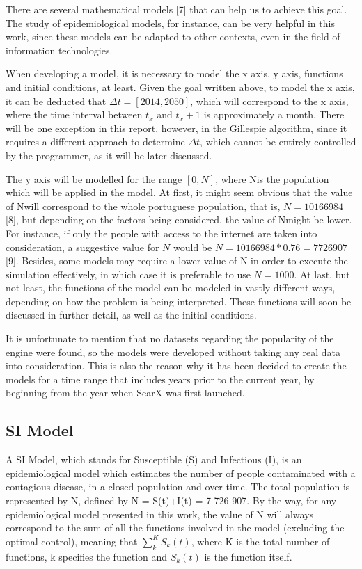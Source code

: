 \documentclass{article}
\begin{document}
There are several mathematical models [7] that can help us to achieve this goal. The study of epidemiological models, for instance, can be very helpful in this work, since these models can be adapted to other contexts, even in the field of information technologies. 

When developing a model, it is necessary to model the x axis, y axis, functions and initial conditions, at least. Given the goal written above, to model the x axis, it can be deducted that $\Delta t = [2014, 2050]$, which will correspond to the x axis, where the time interval between $t_x$ and $t_x+1$ is approximately a month. There will be one exception in this report, however, in the Gillespie algorithm, since it requires a different approach to determine $\Delta t$, which cannot be entirely controlled by the programmer, as it will be later discussed.

The y axis will be modelled for the range $[0, N]$, where Nis the population which will be applied in the model. At first, it might seem obvious that the value of Nwill correspond to the whole portuguese population, that is, $N = 10 166 984$ [8], but depending on the factors being considered, the value of Nmight be lower. For instance, if only the people with access to the internet are taken into consideration, a suggestive value for $N$ would be $N = 10 166 984 * 0.76 = 7 726 907$ [9]. Besides, some models may require a lower value of N in order to execute the simulation effectively, in which case it is preferable to use $N = 1000$. At last, but not least, the functions of the model can be modeled in vastly different ways, depending on how the problem is being interpreted. These functions will soon be discussed in further detail, as well as the initial conditions.

It is unfortunate to mention that no datasets regarding the popularity of the engine were found, so the models were developed without taking any real data into consideration. This is also the reason why it has been decided to create the models for a time range that includes years prior to the current year, by beginning from the year when SearX was first launched.

\subsection{SI Model}

A SI Model, which stands for Susceptible (S) and Infectious (I), is an epidemiological model which estimates the number of people contaminated with a contagious disease, in a closed population and over time. The total population is represented by N, defined by N = S(t)+I(t) = 7 726 907. By the way, for any epidemiological model presented in this work, the value of N will always correspond to the sum of all the functions involved in the model (excluding the optimal control), meaning that $\sum_k^K S_k(t)$, where K is the total number of functions, k specifies the function and $S_k(t)$ is the function itself. 
\end{document}
